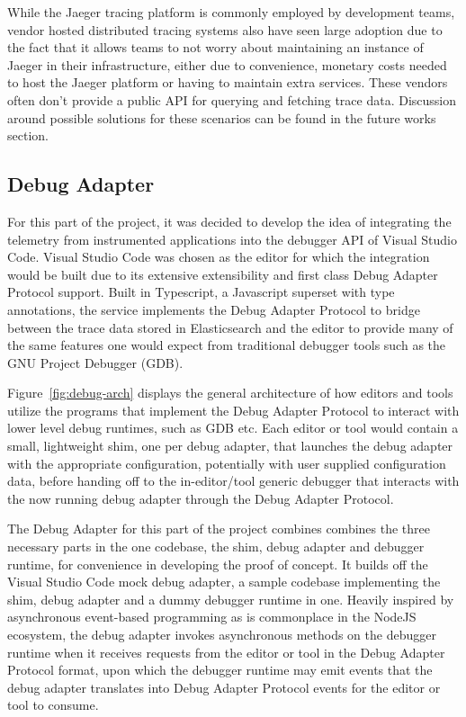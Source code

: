 \documentclass[12pt,pdftex,titlepage]{report}
\begin{document}
                    While the Jaeger tracing platform is commonly employed by development teams, vendor hosted distributed tracing systems also have seen large adoption due to the 
                    fact that it allows teams to not worry about maintaining an instance of Jaeger in their infrastructure, either due to convenience, monetary costs needed to host
                    the Jaeger platform or having to maintain extra services. These vendors often don't provide a public API for querying and fetching trace data. Discussion around
                    possible solutions for these scenarios can be found in the future works section.

            \subsection{Debug Adapter}
                For this part of the project, it was decided to develop the idea of integrating the telemetry from instrumented applications into the debugger API of Visual Studio Code.
                Visual Studio Code was chosen as the editor for which the integration would be built due to its extensive extensibility and first class Debug Adapter Protocol support. 
                Built in Typescript, a Javascript superset with type annotations, the service implements the Debug Adapter Protocol to bridge between the trace data stored in Elasticsearch
                and the editor to provide many of the same features one would expect from traditional debugger tools such as the GNU Project Debugger (GDB).

                Figure~\ref{fig:debug-arch} displays the general architecture of how editors and tools utilize the programs that implement the Debug Adapter Protocol to interact with
                lower level debug runtimes, such as GDB etc. Each editor or tool would contain a small, lightweight shim, one per debug adapter, that launches the debug adapter with the
                appropriate configuration, potentially with user supplied configuration data, before handing off to the in-editor/tool generic debugger that interacts with the now running
                debug adapter through the Debug Adapter Protocol.

                The Debug Adapter for this part of the project combines combines the three necessary parts in the one codebase, the shim, debug adapter and debugger runtime, for convenience
                in developing the proof of concept. It builds off the Visual Studio Code mock debug adapter, a sample codebase implementing the shim, debug adapter and a dummy debugger
                runtime in one. Heavily inspired by asynchronous event-based programming as is commonplace in the NodeJS ecosystem, the debug adapter invokes asynchronous methods on the 
                debugger runtime when it receives requests from the editor or tool in the Debug Adapter Protocol format, upon which the debugger runtime may emit events that the debug adapter
                translates into Debug Adapter Protocol events for the editor or tool to consume.
\end{document}
